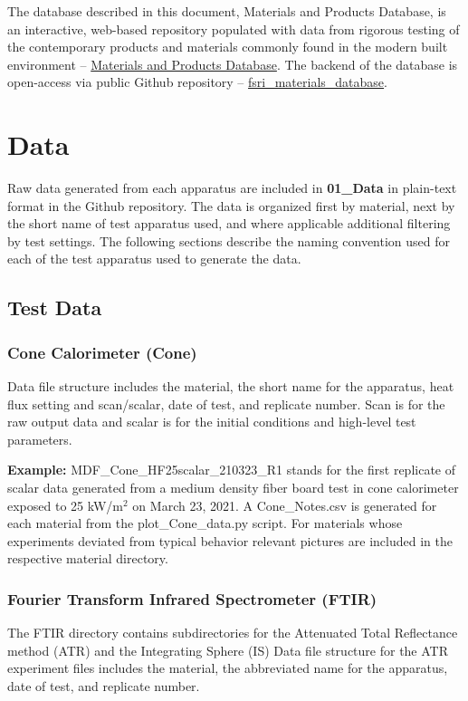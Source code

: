 \documentclass[12pt,oneside]{book}
\begin{document}
The database described in this document, Materials and Products Database, is an interactive, web-based repository populated with data from rigorous testing of the contemporary products and materials commonly found in the modern built environment -- \href{https://materials.fsri.org}{Materials and Products Database}. The backend of the database is open-access via public Github repository -- \href{https://github.com/ulfsri/fsri_materials_database}{fsri\_materials\_database}.

\chapter{Data}
\label{sec:data}

Raw data generated from each apparatus are included in {\bf 01\_Data} in plain-text format in the Github repository. The data is organized first by material, next by the short name of test apparatus used, and where applicable additional filtering by test settings. The following sections describe the naming convention used for each of the test apparatus used to generate the data.

\section{Test Data}

\subsection{Cone Calorimeter (Cone)}
Data file structure includes the material, the short name for the apparatus, heat flux setting and scan/scalar, date of test, and replicate number. Scan is for the raw output data and scalar is for the initial conditions and high-level test parameters.

{\bf Example:} MDF\_Cone\_HF25scalar\_210323\_R1 stands for the first replicate of scalar data generated from a medium density fiber board test in cone calorimeter exposed to 25 kW/m$^2$ on March 23, 2021.
A Cone\_Notes.csv is generated for each material from the plot\_Cone\_data.py script. For materials whose experiments deviated from typical behavior relevant pictures are included in the respective material directory.

\subsection{Fourier Transform Infrared Spectrometer (FTIR)}
The FTIR directory contains subdirectories for the Attenuated Total Reflectance method (ATR) and the Integrating Sphere (IS)
Data file structure for the ATR experiment files includes the material, the abbreviated name for the apparatus, date of test, and replicate number.
\end{document}
